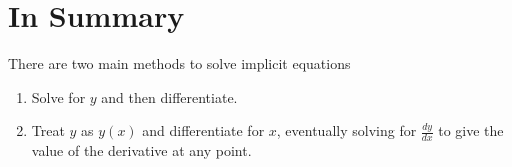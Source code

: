 \documentclass{ximera}
\begin{document}
\section{In Summary}
There are two main methods to solve implicit equations
\begin{enumerate}
\item{Solve for $y$ and then differentiate.}
\item{Treat $y$ as $y(x)$ and differentiate for $x$, eventually solving for $\frac{dy}{dx}$ to give the value of the derivative at any point.}
\end{enumerate}
\pagebreak
\end{document}
